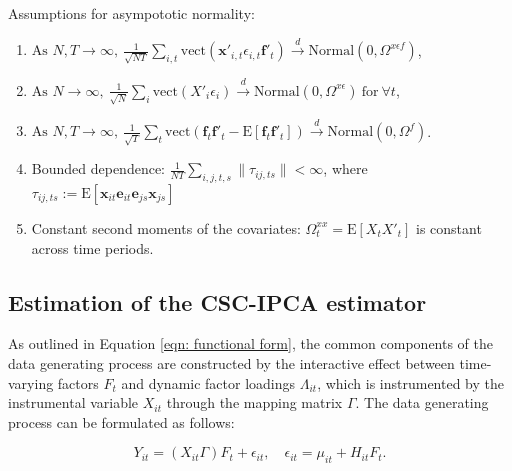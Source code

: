 \documentclass[12pt]{article}
\begin{document}
\begin{assumption}
Assumptions for asympototic normality:
\begin{enumerate}
    \item $\text{As } N, T \to \infty, \: \frac{1}{\sqrt{NT}} \sum_{i,t} \text{vect}\left( \mathbf{x}'_{i,t} \epsilon_{i,t} \mathbf{f}'_{t} \right) \xrightarrow{d} \text{Normal} \left(0, \Omega^{x\epsilon f} \right)$,
    
    \item $\text{As } N \to \infty, \: \frac{1}{\sqrt{N}} \sum_{i} \text{vect}\left( X'_{i} \epsilon_{i} \right) \xrightarrow{d} \text{Normal} \left(0, \Omega^{x\epsilon} \right) \: \text{for} \: \forall t$,
    
    \item $\text{As } N, T \to \infty, \: \frac{1}{\sqrt{T}} \sum_{t} \text{vect}\left( \mathbf{f}_{t}\mathbf{f}'_{t} - \mathrm{E}[\mathbf{f}_{t}\mathbf{f}'_{t}] \right) \xrightarrow{d} \text{Normal} \left(0, \Omega^{f} \right)$.
    
    \item Bounded dependence: $\frac{1}{NT} \sum_{i,j,t,s}\|\tau_{ij, ts}\| < \infty$, where $\tau_{ij, ts} := \mathrm{E} \left[ \mathbf{x}_{it} \mathbf{e}_{it} \mathbf{e}_{js} \mathbf{x}_{js} \right]$
    
    \item Constant second moments of the covariates: $\Omega_t^{xx} = \mathrm{E}\left[ X_{t} X'_{t} \right]$ is constant across time periods.
    \end{enumerate}
    \label{app: ass normality}
\end{assumption}

\subsection{Estimation of the CSC-IPCA estimator}
\label{sec: appendix estimation}

As outlined in Equation \ref{eqn: functional form}, the common components of the data generating process are constructed by the interactive effect between time-varying factors $F_t$ and dynamic factor loadings $\Lambda_{it}$, which is instrumented by the instrumental variable $X_{it}$ through the mapping matrix $\Gamma$. The data generating process can be formulated as follows:

\begin{equation}
\label{app: eqn combined}
Y_{it} = (X_{it}\Gamma) F_{t} + \epsilon_{it}, \quad \epsilon_{it} = \mu_{it} + H_{it} F_t.
\end{equation}
\end{document}
